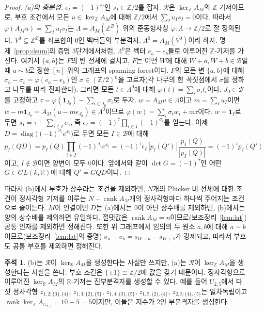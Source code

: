 \documentclass[11pt,a4paper]{article}
\theoremstyle{plain}
\theoremstyle{definition}
\newtheorem{remark}[theorem]{주석}
\newcommand{\R}{\mathbb R}
\newcommand{\Z}{\mathbb Z}
\newcommand{\AM}{A_M}
\newcommand{\kerZ}{\ker_{\Z}\!A_M}
\newcommand{\kerR}{\ker_{\R}\!A_M}
\newcommand{\bs}{\mathcal B}
\newcommand{\rank}{\operatorname{rank}}
\newcommand{\ind}{\mathbf 1}
\begin{document}
\begin{proof}
\emph{(a)의 충분성.} $\epsilon_I=(-1)^{s_I}$인 $s_I\in\Z/2$를 잡자. $\mathcal R$은 $\kerZ$의 $\Z$\nobreakdash-기저이므로, 부호 조건에서 모든 $u\in\kerZ$에 대해 $\Z/2$에서 $\sum_I u_Is_I=0$이다. 따라서 $\varphi(\AM u)=\sum_I u_Is_I$는 $\Lambda=\AM(\Z^{\bs})$ 위의 준동형사상 $\varphi:\Lambda\to\Z/2$로 잘 정의된다. $V^0\subseteq\Z^{\bs}$를 좌표합이 $0$인 벡터들의 부분격자, $\Lambda^0=\AM(V^0)$이라 하자. 명제~\ref{prop:dsum}의 증명 3단계에서처럼, $\Lambda^0$은 벡터 $e_a-e_b$들로 이루어진 $\Z$\nobreakdash-기저를 가진다. 여기서 $\{a,b\}$는 $F$의 변 전체에 걸치고, $F$는 어떤 $W$에 대해 $W+a,W+b\in\bs$일 때 $a\sim b$로 정한 $[n]$ 위의 그래프의 spanning forest이다. $F$의 모든 변 $\{a,b\}$에 대해 $\sigma_a-\sigma_b=\varphi(e_a-e_b)$인 $\sigma\in(\Z/2)^n$을 고르자(각 나무의 한 꼭짓점에서 $\sigma$를 정하고 나무를 따라 전파한다). 그러면 모든 $t\in\Lambda^0$에 대해 $\varphi(t)=\sum_i\sigma_it_i$이다. $J_0\in\bs$를 고정하고 $\tau=\varphi(\ind_{J_0})-\sum_{i\in J_0}\sigma_i$로 두자. $w=\AM u\in\Lambda$이고 $m=\sum_Iu_I$이면 $w-m\ind_{J_0}=\AM(u-me_{J_0})\in\Lambda^0$이므로 $\varphi(w)=\sum_i\sigma_iw_i+m\tau$이다. $w=\ind_I$로 두면 $s_I=\tau+\sum_{i\in I}\sigma_i$, 즉 $\epsilon_I=(-1)^{\tau}\prod_{i\in I}(-1)^{\sigma_i}$를 얻는다. 이제 $D=\operatorname{diag}\big((-1)^{\sigma_i}e^{x_i}\big)$로 두면 모든 $I\in\bs$에 대해
\[
p_I(QD)=p_I(Q)\prod_{i\in I}(-1)^{\sigma_i}e^{x_i}=(-1)^{\tau}\epsilon_I\,|p_I(Q')|\,\frac{p_I(Q)}{|p_I(Q)|}=(-1)^{\tau}p_I(Q')
\]
이고, $I\notin\bs$이면 양변이 모두 $0$이다. 앞에서와 같이 $\det G=(-1)^{\tau}$인 어떤 $G\in GL(k,\R)$에 대해 $Q'=GQD$이다.
\end{proof}

따라서 (b)에서 부호가 상수라는 조건을 제외하면, $N$개의 Plücker 비 전체에 대한 조건이 정사각형 기저를 이루는 $N-\rank\AM$개의 정사각형마다 하나씩 주어지는 조건으로 줄어든다. $M$이 연결이면 $D$는 (a)에서는 $0$이 아닌 상수배를 제외하면, (b)에서는 양의 상수배를 제외하면 유일하다. 절댓값은 $\rank\AM=n$이므로(보조정리~\ref{lem:lat}) 공통 인자를 제외하면 정해진다. 또한 위 그래프에서 임의의 두 원소 $a,b$에 대해 $a\sim b$이므로(보조정리~\ref{lem:lat}의 증명) $\sigma_a-\sigma_b=s_{W+a}-s_{W+b}$가 강제되고, 따라서 부호도 공통 부호를 제외하면 정해진다.

\begin{remark}\label{rem:index}
(b)는 $\mathcal R$이 $\kerR$을 생성한다는 사실만 쓰지만, (a)는 $\mathcal R$이 $\kerZ$을 생성한다는 사실을 쓴다. 부호 조건은 $\{\pm1\}\cong\Z/2$에 값을 갖기 때문이다. 정사각형으로 이루어진 $\kerR$의 $\R$\nobreakdash-기저는 진부분격자를 생성할 수 있다. 예를 들어 $U_{2,5}$에서 다섯 정사각형 $z_{1,2;\{3\},\{4\}}$, $z_{1,3;\{2\},\{5\}}$, $z_{1,4;\{3\},\{5\}}$, $z_{1,5;\{2\},\{4\}}$, $z_{2,3;\{4\},\{5\}}$는 일차독립이고 $\rank\ker_\Z A_{U_{2,5}}=10-5=5$이지만, 이들은 지수가 $2$인 부분격자를 생성한다.
\end{remark}
\end{document}
